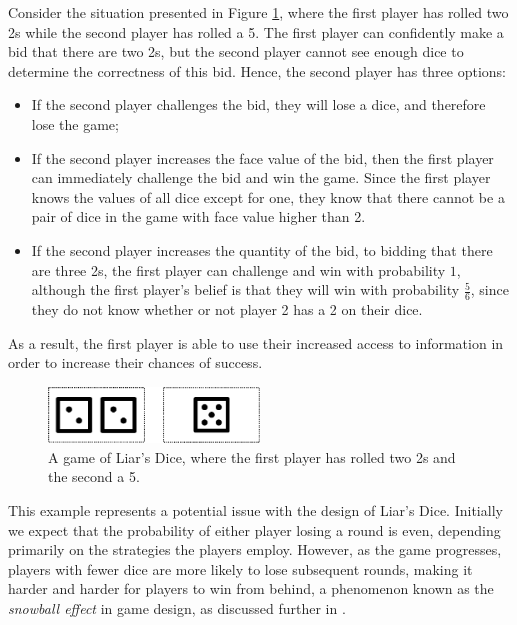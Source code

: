 \begin{example}
\label{cs2:hidden_info_example}

Consider the situation presented in Figure \ref{cs2:uneven_information}, where the first player has rolled two 2s while the second player has rolled a 5. The first player can confidently make a bid that there are two 2s, but the second player cannot see enough dice to determine the correctness of this bid. Hence, the second player has three options:

\begin{itemize}

\item If the second player challenges the bid, they will lose a dice, and therefore lose the game;
\item If the second player increases the face value of the bid, then the first player can immediately challenge the bid and win the game. Since the first player knows the values of all dice except for one, they know that there cannot be a pair of dice in the game with face value higher than 2.
\item If the second player increases the quantity of the bid, to bidding that there are three 2s, the first player can challenge and win with probability $1$, although the first player's belief is that they will win with probability $\frac{5}{6}$, since they do not know whether or not player 2 has a 2 on their dice.

\end{itemize}

As a result, the first player is able to use their increased access to information in order to increase their chances of success.
\end{example}

\begin{figure}[h]
    \centering
    \includegraphics[width=0.5\textwidth]{images/LiarsDice/different_information.pdf}
    \caption{A game of Liar's Dice, where the first player has rolled two 2s and the second a 5.}
    \label{cs2:uneven_information}
    \vspace*{-0.2cm}
\end{figure}

This example represents a potential issue with the design of Liar's Dice. Initially we expect that the probability of either player losing a round is even, depending primarily on the strategies the players employ. However, as the game progresses, players with fewer dice are more likely to lose subsequent rounds, making it harder and harder for players to win from behind, a phenomenon known as the \emph{snowball effect} in game design, as discussed further in \cite{noauthor_snowball_nodate}.

